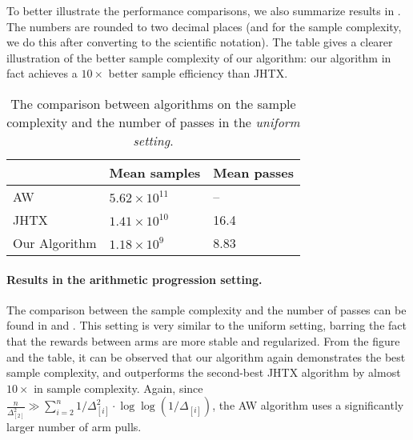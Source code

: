 To better illustrate the performance comparisons, we also summarize results in . The numbers are rounded to two decimal places (and for the sample complexity, we do this after converting to the scientific notation). The table gives a clearer illustration of the better sample complexity of our algorithm: our algorithm in fact achieves a $10\times$ better sample efficiency than JHTX.
\begin{table}[!h]
	\centering
	\captionsetup{justification=centering}
	\caption{\label{tab:exp-uniform} The comparison between algorithms on the sample complexity and the number of passes in the \emph{uniform setting}.}
	\begin{tabular}{|l|l|l|}
		\hline
		& Mean samples & Mean passes \\ \hline
		AW & $5.62\times 10^{11}$ & -- \\ \hline
		JHTX & $1.41\times 10^{10}$ & 16.4 \\ \hline
		Our Algorithm & $1.18\times 10^{9}$ & 8.83  \\ \hline
	\end{tabular}
	
\end{table}

\paragraph{Results in the arithmetic progression setting.} The comparison between the sample complexity and the number of passes can be found in  and . This setting is very similar to the uniform setting, barring the fact that the rewards between arms are more stable and regularized. From the figure and the table, it can be observed that our algorithm again demonstrates the best sample complexity, and outperforms the second-best JHTX algorithm by almost $10\times$ in sample complexity. Again, since $\frac{n}{\Delta^2_{[2]}} \gg \sum_{i=2}^{n}1/\Delta^2_{[i]}\cdot \log\log(1/\Delta_{[i]})$, the AW algorithm uses a significantly larger number of arm pulls.  

